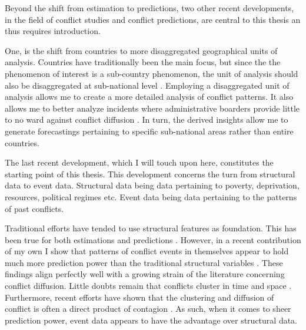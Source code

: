 \documentclass[a4paper]{article}
\begin{document}
Beyond the shift from estimation to predictions, two other recent developments, in the field of conflict studies and conflict predictions, are central to this thesis an thus requires introduction.\par

One, is the shift from countries to more disaggregated geographical units of analysis. Countries have traditionally been the main focus, but since the the phenomenon of interest is a sub-country phenomenon, the unit of analysis should also be disaggregated at sub-national level \citep[490]{Cederman_Gleditsch_2009}. Employing a disaggregated unit of analysis allows me to create a more detailed analysis of conflict patterns. It also allows me to better analyze incidents where administrative boarders provide little to no ward against conflict diffusion \citep[445-446]{ol2010afghanistan}. In turn, the derived insights allow me to generate forecastings pertaining to specific sub-national areas rather than entire countries.\par

The last recent development, which I will touch upon here, constitutes the starting point of this thesis. This development concerns the turn from structural data to event data. Structural data being data pertaining to poverty, deprivation, resources, political regimes etc. Event data being data pertaining to the patterns of past conflicts.\par 

Traditional efforts have tended to use structural features as foundation. This has been true for both estimations and predictions \cite[10]{chadefaux2017conflict}. However, in a recent contribution of my own I show that patterns of conflict events in themselves appear to hold much more prediction power than the traditional structural variables \citep{Maase}. These findings align perfectly well with a growing strain of the literature concerning conflict diffusion. Little doubts remain that conflicts cluster in time and space \citep[15]{crost2015conflict}. Furthermore, recent efforts have shown that the clustering and diffusion of conflict is often a direct product of contagion \citep{buhaug2008contagion,schutte2011diffusion,crost2015conflict,bara_2017}. As such, when it comes to sheer prediction power, event data appears to have the advantage over structural data.\par
\end{document}
